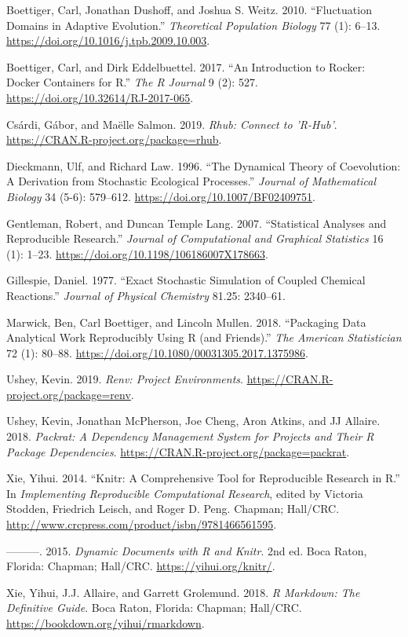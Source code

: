 \documentclass[
]{rescience}
\begin{document}
\leavevmode\hypertarget{ref-Boettiger2010}{}%
Boettiger, Carl, Jonathan Dushoff, and Joshua S. Weitz. 2010.
``Fluctuation Domains in Adaptive Evolution.'' \emph{Theoretical
Population Biology} 77 (1): 6--13.
\url{https://doi.org/10.1016/j.tpb.2009.10.003}.

\leavevmode\hypertarget{ref-Boettiger2017}{}%
Boettiger, Carl, and Dirk Eddelbuettel. 2017. ``An Introduction to
Rocker: Docker Containers for R.'' \emph{The R Journal} 9 (2): 527.
\url{https://doi.org/10.32614/RJ-2017-065}.

\leavevmode\hypertarget{ref-rhub}{}%
Csárdi, Gábor, and Maëlle Salmon. 2019. \emph{Rhub: Connect to 'R-Hub'}.
\url{https://CRAN.R-project.org/package=rhub}.

\leavevmode\hypertarget{ref-Dieckmann1996}{}%
Dieckmann, Ulf, and Richard Law. 1996. ``The Dynamical Theory of
Coevolution: A Derivation from Stochastic Ecological Processes.''
\emph{Journal of Mathematical Biology} 34 (5-6): 579--612.
\url{https://doi.org/10.1007/BF02409751}.

\leavevmode\hypertarget{ref-TempleLang2007}{}%
Gentleman, Robert, and Duncan Temple Lang. 2007. ``Statistical Analyses
and Reproducible Research.'' \emph{Journal of Computational and
Graphical Statistics} 16 (1): 1--23.
\url{https://doi.org/10.1198/106186007X178663}.

\leavevmode\hypertarget{ref-Gillespie}{}%
Gillespie, Daniel. 1977. ``Exact Stochastic Simulation of Coupled
Chemical Reactions.'' \emph{Journal of Physical Chemistry} 81.25:
2340--61.

\leavevmode\hypertarget{ref-Marwick}{}%
Marwick, Ben, Carl Boettiger, and Lincoln Mullen. 2018. ``Packaging Data
Analytical Work Reproducibly Using R (and Friends).'' \emph{The American
Statistician} 72 (1): 80--88.
\url{https://doi.org/10.1080/00031305.2017.1375986}.

\leavevmode\hypertarget{ref-renv}{}%
Ushey, Kevin. 2019. \emph{Renv: Project Environments}.
\url{https://CRAN.R-project.org/package=renv}.

\leavevmode\hypertarget{ref-packrat}{}%
Ushey, Kevin, Jonathan McPherson, Joe Cheng, Aron Atkins, and JJ
Allaire. 2018. \emph{Packrat: A Dependency Management System for
Projects and Their R Package Dependencies}.
\url{https://CRAN.R-project.org/package=packrat}.

\leavevmode\hypertarget{ref-knitr}{}%
Xie, Yihui. 2014. ``Knitr: A Comprehensive Tool for Reproducible
Research in R.'' In \emph{Implementing Reproducible Computational
Research}, edited by Victoria Stodden, Friedrich Leisch, and Roger D.
Peng. Chapman; Hall/CRC.
\url{http://www.crcpress.com/product/isbn/9781466561595}.

\leavevmode\hypertarget{ref-knitr_book}{}%
---------. 2015. \emph{Dynamic Documents with R and Knitr}. 2nd ed. Boca
Raton, Florida: Chapman; Hall/CRC. \url{https://yihui.org/knitr/}.

\leavevmode\hypertarget{ref-rmarkdown}{}%
Xie, Yihui, J.J. Allaire, and Garrett Grolemund. 2018. \emph{R Markdown:
The Definitive Guide}. Boca Raton, Florida: Chapman; Hall/CRC.
\url{https://bookdown.org/yihui/rmarkdown}.


\hypersetup{linkcolor=black,urlcolor=darkgray}
\renewcommand\emph[1]{{\bfseries #1}}
\setlength\bibitemsep{0pt}
\printbibliography
\end{document}
